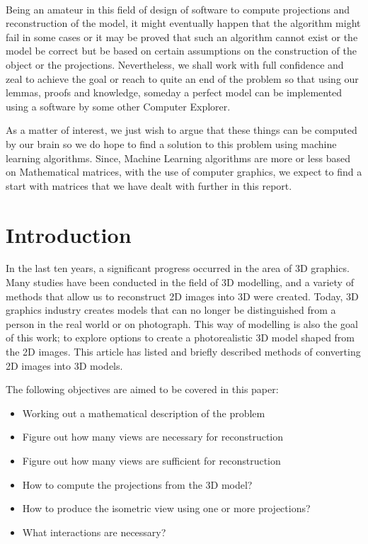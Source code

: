 \documentclass[12pt]{report}
\begin{document}
\\
\vspace{0.2cm}

Being an amateur in this field of design of software to compute projections and reconstruction of the model, it might eventually happen that the algorithm might fail in some cases or it may be proved that such an algorithm cannot exist or the model be correct but be based on certain assumptions on the construction of the object or the projections. Nevertheless, we shall work with full confidence and zeal to achieve the goal or reach to quite an end of the problem so that using our lemmas, proofs and knowledge, someday a perfect model can be implemented using a software by some other Computer Explorer. 
\\
\vspace{0.2cm}

As a matter of interest, we just wish to argue that these things can be computed by our brain so we do hope to find a solution to this problem using machine learning algorithms. Since, Machine Learning algorithms are more or less based on Mathematical matrices, with the use of computer graphics, we expect to find a start with matrices that we have dealt with further in this report. 

\newpage

\tableofcontents

\newpage

\chapter{Introduction}

In the last ten years, a significant progress occurred in the area of 3D graphics. Many studies have been conducted in the field of 3D modelling, and a variety of methods that allow us to reconstruct 2D images into 3D were created. Today, 3D graphics industry creates models that can no longer be distinguished from a person in the real world or on photograph. This way of modelling is also the goal of this work; to explore options to create a photorealistic 3D model shaped from the 2D images. This article has listed and briefly described methods of converting 2D images into 3D models.
\vspace{1cm}

The following objectives are aimed to be covered in this paper:

\begin{itemize}
  \item
  Working out a mathematical description of the problem
  \item
  Figure out how many views are necessary for reconstruction
  \item
  Figure out how many views are sufficient for reconstruction
  \item
  How to compute the projections from the 3D model?
  \item
  How to produce the isometric view using one or more projections?
  \item
  What interactions are necessary?
  
\end{itemize}
\end{document}
